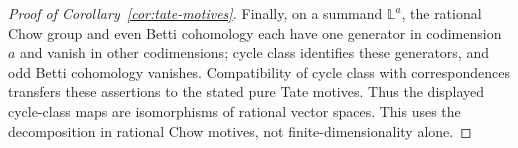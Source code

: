 \begin{proof}[Proof of Corollary~\ref{cor:tate-motives}]
Finally, on a summand \(\mathbb L^a\), the rational Chow group and
even Betti cohomology each have one generator in codimension \(a\)
and vanish in other codimensions; cycle class identifies these
generators, and odd Betti cohomology vanishes. Compatibility of cycle
class with correspondences transfers these assertions to the stated
pure Tate motives. Thus the displayed cycle-class maps are
isomorphisms of rational vector spaces. This uses the decomposition
in rational Chow motives, not finite-dimensionality alone.
\end{proof}
